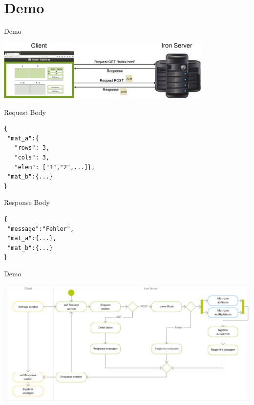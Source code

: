 \documentclass{beamer}
\begin{document}
\section{Demo}
\begin{frame}[fragile]{Demo}
\begin{center}
\includegraphics[width=0.8\textwidth]{uebersicht.png}
\vspace{1cm}
\pause
\begin{minipage}[t]{.4\textwidth}
{\scriptsize Request Body}
\begin{lstlisting}
{
 "mat_a":{
   "rows": 3,
   "cols": 3,
   "elem": ["1","2",...]},
 "mat_b":{...}
}
\end{lstlisting}				
\end{minipage}
\hspace{2cm}
\pause
\begin{minipage}[t]{.3\textwidth}
{\scriptsize Response Body}
\begin{lstlisting}
{
 "message":"Fehler",
 "mat_a":{...},
 "mat_b":{...}
}
\end{lstlisting}				
\end{minipage}

\end{center}
\end{frame}
\begin{frame}{Demo}
\begin{center}
\includegraphics[width=\textwidth]{Iron_Server.png}
\end{center}
\end{frame}
\end{document}
